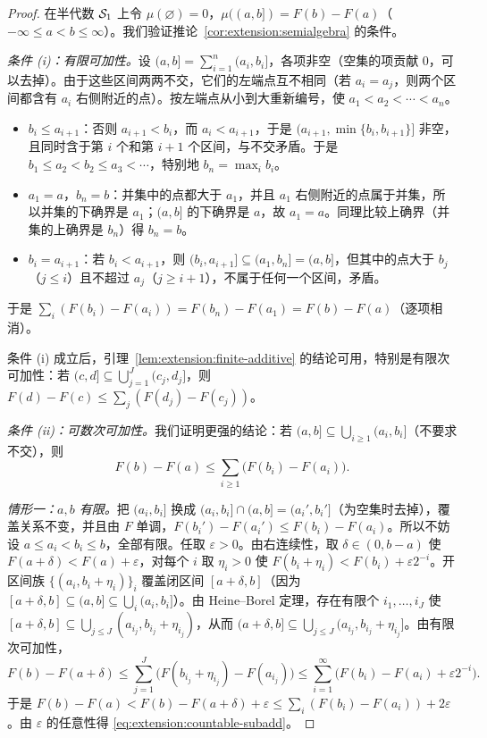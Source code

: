 \begin{proof}
在半代数 $\mathcal{S}_1$ 上令 $\mu(\varnothing)=0$，$\mu((a,b])=F(b)-F(a)$（$-\infty\leqslant a<b\leqslant\infty$）。我们验证推论~\ref{cor:extension:semialgebra} 的条件。

\emph{条件 (i)：有限可加性。}设 $(a,b]=\sum_{i=1}^n(a_i,b_i]$，各项非空（空集的项贡献 $0$，可以去掉）。由于这些区间两两不交，它们的左端点互不相同（若 $a_i=a_j$，则两个区间都含有 $a_i$ 右侧附近的点）。按左端点从小到大重新编号，使 $a_1<a_2<\cdots<a_n$。
\begin{itemize}
\item $b_i\leqslant a_{i+1}$：否则 $a_{i+1}<b_i$，而 $a_i<a_{i+1}$，于是 $(a_{i+1},\min\{b_i,b_{i+1}\}]$ 非空，且同时含于第 $i$ 个和第 $i+1$ 个区间，与不交矛盾。于是 $b_1\leqslant a_2<b_2\leqslant a_3<\cdots$，特别地 $b_n=\max_ib_i$。
\item $a_1=a$，$b_n=b$：并集中的点都大于 $a_1$，并且 $a_1$ 右侧附近的点属于并集，所以并集的下确界是 $a_1$；$(a,b]$ 的下确界是 $a$，故 $a_1=a$。同理比较上确界（并集的上确界是 $b_n$）得 $b_n=b$。
\item $b_i=a_{i+1}$：若 $b_i<a_{i+1}$，则 $(b_i,a_{i+1}]\subseteq(a_1,b_n]=(a,b]$，但其中的点大于 $b_j$（$j\leqslant i$）且不超过 $a_j$（$j\geqslant i+1$），不属于任何一个区间，矛盾。
\end{itemize}
于是 $\sum_i(F(b_i)-F(a_i))=F(b_n)-F(a_1)=F(b)-F(a)$（逐项相消）。

条件 (i) 成立后，引理~\ref{lem:extension:finite-additive} 的结论可用，特别是有限次可加性：若 $(c,d]\subseteq\bigcup_{j=1}^J(c_j,d_j]$，则 $F(d)-F(c)\leqslant\sum_j(F(d_j)-F(c_j))$。

\emph{条件 (ii)：可数次可加性。}我们证明更强的结论：若 $(a,b]\subseteq\bigcup_{i\geqslant1}(a_i,b_i]$（不要求不交），则
\begin{equation}\label{eq:extension:countable-subadd}
F(b)-F(a)\leqslant\sum_{i\geqslant1}\bigl(F(b_i)-F(a_i)\bigr).
\end{equation}

\emph{情形一：$a,b$ 有限。}把 $(a_i,b_i]$ 换成 $(a_i,b_i]\cap(a,b]=(a_i',b_i']$（为空集时去掉），覆盖关系不变，并且由 $F$ 单调，$F(b_i')-F(a_i')\leqslant F(b_i)-F(a_i)$。所以不妨设 $a\leqslant a_i<b_i\leqslant b$，全部有限。任取 $\varepsilon>0$。由右连续性，取 $\delta\in(0,b-a)$ 使 $F(a+\delta)<F(a)+\varepsilon$，对每个 $i$ 取 $\eta_i>0$ 使 $F(b_i+\eta_i)<F(b_i)+\varepsilon2^{-i}$。开区间族 $\{(a_i,b_i+\eta_i)\}_i$ 覆盖闭区间 $[a+\delta,b]$（因为 $[a+\delta,b]\subseteq(a,b]\subseteq\bigcup_i(a_i,b_i]$）。由 Heine--Borel 定理，存在有限个 $i_1,\dots,i_J$ 使 $[a+\delta,b]\subseteq\bigcup_{j\leqslant J}(a_{i_j},b_{i_j}+\eta_{i_j})$，从而 $(a+\delta,b]\subseteq\bigcup_{j\leqslant J}(a_{i_j},b_{i_j}+\eta_{i_j}]$。由有限次可加性，
\[
F(b)-F(a+\delta)\leqslant\sum_{j=1}^J\bigl(F(b_{i_j}+\eta_{i_j})-F(a_{i_j})\bigr)\leqslant\sum_{i=1}^\infty\bigl(F(b_i)-F(a_i)+\varepsilon2^{-i}\bigr).
\]
于是 $F(b)-F(a)<F(b)-F(a+\delta)+\varepsilon\leqslant\sum_i(F(b_i)-F(a_i))+2\varepsilon$。由 $\varepsilon$ 的任意性得 \eqref{eq:extension:countable-subadd}。


\end{proof}
